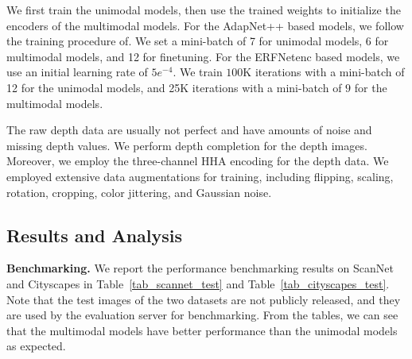 \documentclass[letterpaper, 10 pt, conference]{ieeeconf}
\begin{document}
	We first train the unimodal models, then use the trained weights to initialize the encoders of the multimodal models.
	For the AdapNet++ based models, we follow the training procedure of\cite{valada2019self}. We set a mini-batch of 7 for unimodal models, 6 for multimodal models, and 12 for finetuning.
	For the ERFNetenc based models, we use an initial learning rate of $5e^{-4}$. We train $100$K iterations with a mini-batch of 12 for the unimodal models, and 25K iterations with a mini-batch of $9$ for the multimodal models. 
	
	The raw depth data are usually not perfect and have amounts of noise and missing depth values. We perform depth completion\cite{ku2018defense} for the depth images. Moreover, we employ the three-channel HHA encoding\cite{gupta2014learning} for the depth data.
	We employed extensive data augmentations for training, including flipping, scaling, rotation, cropping, color jittering, and Gaussian noise.
	
	\subsection{Results and Analysis}
	\textbf{Benchmarking.} We report the performance benchmarking results on ScanNet and Cityscapes in Table~\ref{tab_scannet_test} and Table~\ref{tab_cityscapes_test}. Note that the test images of the two datasets are not publicly released, and they are used by the evaluation server for benchmarking. From the tables, we can see that the multimodal models have better performance than the unimodal models as expected.
	
\end{document}
